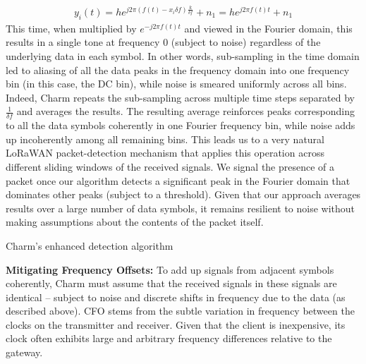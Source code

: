 \begin{align}
    y_i\left(t\right) = h e^{j 2 \pi (f(t) - x_i \delta f) \frac{k}{\delta f}} + n_1 = h e^{j 2 \pi f(t) t} + n_1\label{eqn:yi2}
\end{align}
This time, when multiplied by $e^{-j 2 \pi f(t) t}$ and viewed in the Fourier domain, this results in a single tone at frequency $0$ (subject to noise) regardless of the underlying data in each symbol. In other words, sub-sampling in the time domain led to aliasing of all the data peaks in the frequency domain into one frequency bin (in this case, the DC bin), while noise is smeared uniformly across all bins. Indeed, Charm repeats the sub-sampling across multiple time steps separated  by $\frac{1}{\delta f}$ and averages the results. The resulting average reinforces peaks corresponding to all the data symbols coherently in one Fourier frequency bin, while noise adds up incoherently among all remaining bins. This leads us to a very natural LoRaWAN packet-detection mechanism that applies this operation across different sliding windows of the received signals. We signal the presence of a packet once our algorithm detects a significant peak in the Fourier domain that dominates other peaks (subject to a threshold). Given that our approach averages results over a large number of data symbols, it remains resilient to noise without making assumptions about the contents of the packet itself.  

\LinesNumbered
\begin{algorithm}[ht]
\caption{Charm's enhanced detection algorithm}
\label{alg:algorithm-label2}
\end{algorithm}

\noindent \textbf{Mitigating Frequency Offsets: } To add up signals from adjacent symbols coherently, Charm must assume that the received signals in these signals are identical -- subject to noise and discrete shifts in frequency due to the data (as described above).  CFO stems from the subtle variation in frequency between the clocks on the transmitter and receiver. Given that the client is inexpensive, its clock often exhibits large and arbitrary frequency differences relative to the gateway. 

